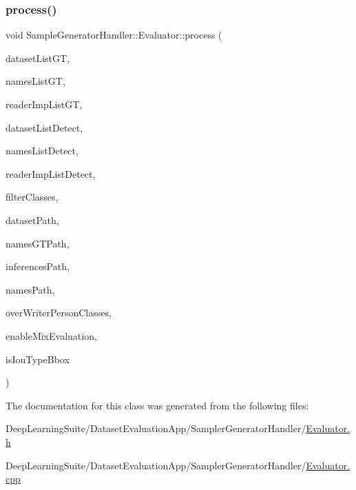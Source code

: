 \subsubsection{\texorpdfstring{process()}{process()}}
{\footnotesize\ttfamily void Sample\+Generator\+Handler\+::\+Evaluator\+::process (\begin{DoxyParamCaption}\item[{Q\+List\+View $\ast$}]{dataset\+List\+GT,  }\item[{Q\+List\+View $\ast$}]{names\+List\+GT,  }\item[{Q\+List\+View $\ast$}]{reader\+Imp\+List\+GT,  }\item[{Q\+List\+View $\ast$}]{dataset\+List\+Detect,  }\item[{Q\+List\+View $\ast$}]{names\+List\+Detect,  }\item[{Q\+List\+View $\ast$}]{reader\+Imp\+List\+Detect,  }\item[{Q\+List\+View $\ast$}]{filter\+Classes,  }\item[{const std\+::string \&}]{dataset\+Path,  }\item[{const std\+::string \&}]{names\+G\+T\+Path,  }\item[{const std\+::string \&}]{inferences\+Path,  }\item[{const std\+::string \&}]{names\+Path,  }\item[{bool}]{over\+Writer\+Person\+Classes,  }\item[{bool}]{enable\+Mix\+Evaluation,  }\item[{bool}]{is\+Iou\+Type\+Bbox }\end{DoxyParamCaption})\hspace{0.3cm}{\ttfamily [static]}}



The documentation for this class was generated from the following files\+:\begin{DoxyCompactItemize}
\item 
Deep\+Learning\+Suite/\+Dataset\+Evaluation\+App/\+Sampler\+Generator\+Handler/\hyperlink{_evaluator_8h}{Evaluator.\+h}\item 
Deep\+Learning\+Suite/\+Dataset\+Evaluation\+App/\+Sampler\+Generator\+Handler/\hyperlink{_dataset_evaluation_app_2_sampler_generator_handler_2_evaluator_8cpp}{Evaluator.\+cpp}\end{DoxyCompactItemize}
